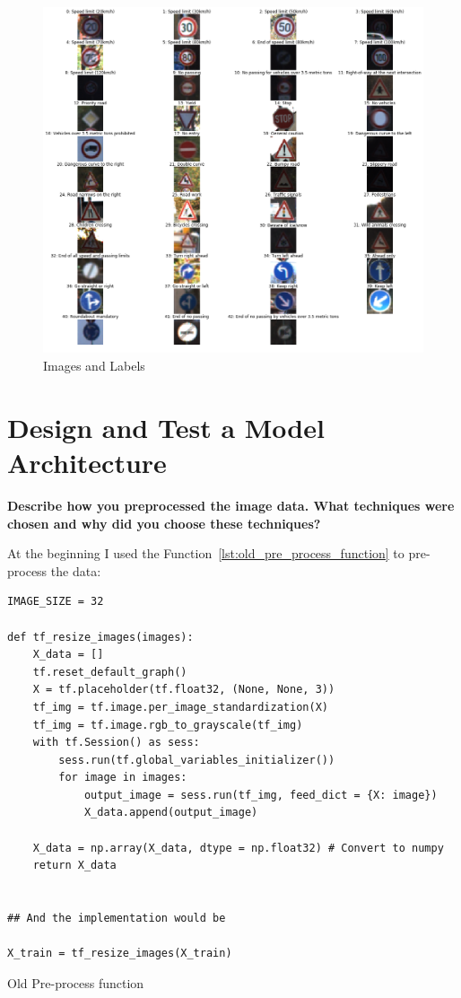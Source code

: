 \documentclass[11pt, a4paper]{article}
\begin{document}
\begin{figure}[htb!]
	\centering
	\includegraphics[width=0.8\linewidth]{images_and_labels}
	\caption{Images and Labels}
	\label{fig:images_and_labels}
\end{figure}



\section{Design and Test a Model Architecture}%
\label{sec:design_and_test_a_model_architecture}

\textbf{Describe how you preprocessed the image data. What techniques were chosen and why did you choose these techniques?}


At the beginning I used the Function~\ref{lst:old_pre_process_function} to pre-process the data:


\begin{listing}
\begin{verbatim}
IMAGE_SIZE = 32

def tf_resize_images(images):
    X_data = []
    tf.reset_default_graph()
    X = tf.placeholder(tf.float32, (None, None, 3))
    tf_img = tf.image.per_image_standardization(X)
    tf_img = tf.image.rgb_to_grayscale(tf_img)
    with tf.Session() as sess:
        sess.run(tf.global_variables_initializer())
        for image in images:
            output_image = sess.run(tf_img, feed_dict = {X: image})
            X_data.append(output_image)

    X_data = np.array(X_data, dtype = np.float32) # Convert to numpy
    return X_data


## And the implementation would be

X_train = tf_resize_images(X_train)

\end{verbatim}
\caption{Old Pre-process function}
\label{lst:old_pre_process_function}
\end{listing}
\end{document}
